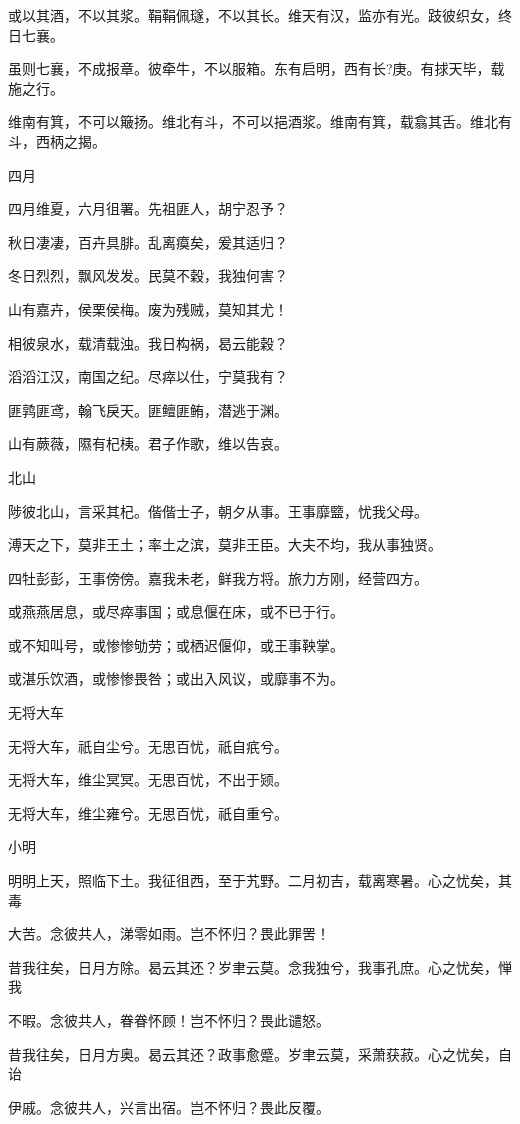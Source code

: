 或以其酒，不以其浆。鞙鞙佩璲，不以其长。维天有汉，监亦有光。跂彼织女，终日七襄。

虽则七襄，不成报章。彼牵牛，不以服箱。东有启明，西有长?庚。有捄天毕，载施之行。

维南有箕，不可以簸扬。维北有斗，不可以挹酒浆。维南有箕，载翕其舌。维北有斗，西柄之揭。

四月

四月维夏，六月徂署。先祖匪人，胡宁忍予？

秋日凄凄，百卉具腓。乱离瘼矣，爰其适归？

冬日烈烈，飘风发发。民莫不穀，我独何害？

山有嘉卉，侯栗侯梅。废为残贼，莫知其尤！

相彼泉水，载清载浊。我日构祸，曷云能穀？

滔滔江汉，南国之纪。尽瘁以仕，宁莫我有？

匪鹑匪鸢，翰飞戾天。匪鳣匪鲔，潜逃于渊。

山有蕨薇，隰有杞桋。君子作歌，维以告哀。

北山

陟彼北山，言采其杞。偕偕士子，朝夕从事。王事靡盬，忧我父母。

溥天之下，莫非王土；率土之滨，莫非王臣。大夫不均，我从事独贤。

四牡彭彭，王事傍傍。嘉我未老，鲜我方将。旅力方刚，经营四方。

或燕燕居息，或尽瘁事国；或息偃在床，或不已于行。

或不知叫号，或惨惨劬劳；或栖迟偃仰，或王事鞅掌。

或湛乐饮酒，或惨惨畏咎；或出入风议，或靡事不为。

无将大车

无将大车，祇自尘兮。无思百忧，祇自疧兮。

无将大车，维尘冥冥。无思百忧，不出于颎。

无将大车，维尘雍兮。无思百忧，祇自重兮。

小明

明明上天，照临下土。我征徂西，至于艽野。二月初吉，载离寒暑。心之忧矣，其毒

大苦。念彼共人，涕零如雨。岂不怀归？畏此罪罟！

昔我往矣，日月方除。曷云其还？岁聿云莫。念我独兮，我事孔庶。心之忧矣，惮我

不暇。念彼共人，眷眷怀顾！岂不怀归？畏此谴怒。

昔我往矣，日月方奥。曷云其还？政事愈蹙。岁聿云莫，采萧获菽。心之忧矣，自诒

伊戚。念彼共人，兴言出宿。岂不怀归？畏此反覆。

